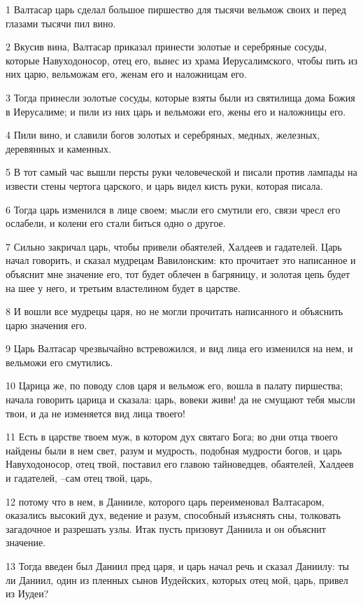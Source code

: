\par 1 Валтасар царь сделал большое пиршество для тысячи вельмож своих и перед глазами тысячи пил вино.
\par 2 Вкусив вина, Валтасар приказал принести золотые и серебряные сосуды, которые Навуходоносор, отец его, вынес из храма Иерусалимского, чтобы пить из них царю, вельможам его, женам его и наложницам его.
\par 3 Тогда принесли золотые сосуды, которые взяты были из святилища дома Божия в Иерусалиме; и пили из них царь и вельможи его, жены его и наложницы его.
\par 4 Пили вино, и славили богов золотых и серебряных, медных, железных, деревянных и каменных.
\par 5 В тот самый час вышли персты руки человеческой и писали против лампады на извести стены чертога царского, и царь видел кисть руки, которая писала.
\par 6 Тогда царь изменился в лице своем; мысли его смутили его, связи чресл его ослабели, и колени его стали биться одно о другое.
\par 7 Сильно закричал царь, чтобы привели обаятелей, Халдеев и гадателей. Царь начал говорить, и сказал мудрецам Вавилонским: кто прочитает это написанное и объяснит мне значение его, тот будет облечен в багряницу, и золотая цепь будет на шее у него, и третьим властелином будет в царстве.
\par 8 И вошли все мудрецы царя, но не могли прочитать написанного и объяснить царю значения его.
\par 9 Царь Валтасар чрезвычайно встревожился, и вид лица его изменился на нем, и вельможи его смутились.
\par 10 Царица же, по поводу слов царя и вельмож его, вошла в палату пиршества; начала говорить царица и сказала: царь, вовеки живи! да не смущают тебя мысли твои, и да не изменяется вид лица твоего!
\par 11 Есть в царстве твоем муж, в котором дух святаго Бога; во дни отца твоего найдены были в нем свет, разум и мудрость, подобная мудрости богов, и царь Навуходоносор, отец твой, поставил его главою тайноведцев, обаятелей, Халдеев и гадателей, --сам отец твой, царь,
\par 12 потому что в нем, в Данииле, которого царь переименовал Валтасаром, оказались высокий дух, ведение и разум, способный изъяснять сны, толковать загадочное и разрешать узлы. Итак пусть призовут Даниила и он объяснит значение.
\par 13 Тогда введен был Даниил пред царя, и царь начал речь и сказал Даниилу: ты ли Даниил, один из пленных сынов Иудейских, которых отец мой, царь, привел из Иудеи?
